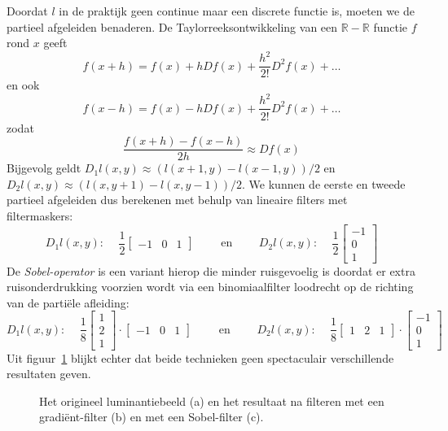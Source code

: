 Doordat $l$ in de praktijk geen continue maar een discrete functie is, moeten we de partieel afgeleiden benaderen.
De Taylorreeksontwikkeling van een $\mathbb{R} - \mathbb{R}$ functie $f$ rond $x$ geeft
$$
f(x+h) = f(x) + h D f(x) + \frac{h^2}{2!} D^2 f(x) + \ldots
$$
en ook
$$
f(x-h) = f(x) - h D f(x) + \frac{h^2}{2!} D^2 f(x) + \ldots
$$
zodat
$$
\frac{f(x+h) - f(x-h)}{2h} \approx D f(x)
$$
Bijgevolg geldt $D_1 l(x,y) \approx (l(x+1,y) - l(x-1,y))/2$ en $D_2 l(x,y) \approx (l(x,y+1) - l(x,y-1))/2$. We
kunnen de eerste en tweede partieel afgeleiden dus berekenen met behulp van lineaire filters met filtermaskers:
$$
D_1 l(x,y)\textrm{: }\quad \frac{1}{2} \left[ \begin{array}{ccc} -1 & 0 & 1 \end{array} \right] \qquad \textrm{ en } 
\qquad D_2 l(x,y)\textrm{: }\quad \frac{1}{2} \left[ \begin{array}{c} -1 \\ 0 \\ 1 \end{array} \right]
$$
De \emph{Sobel-operator} is een variant hierop die minder ruisgevoelig is doordat er 
extra ruisonderdrukking voorzien wordt via een binomiaalfilter loodrecht op de richting 
van de parti\"ele afleiding:
$$
D_1 l(x,y)\textrm{: }\quad \frac{1}{8} \left[ \begin{array}{c} 1 \\ 2 \\ 1 \end{array} \right] \cdot \left[ \begin{array}{ccc} -1 & 0 & 1 \end{array} \right] \qquad \textrm{ en } 
\qquad D_2 l(x,y)\textrm{: }\quad \frac{1}{8} \left[ \begin{array}{ccc} 1 & 2 & 1 \end{array} \right] \cdot \left[ \begin{array}{c} -1 \\ 0 \\ 1 \end{array} \right]
$$
Uit figuur~\ref{fig:randdetectie} blijkt echter dat beide technieken geen spectaculair verschillende 
resultaten geven.

\begin{figure}[tb]
\begin{center}
\caption{\label{fig:randdetectie}Het origineel luminantiebeeld (a) en het resultaat na filteren met een gradi\"ent-filter (b) en met een Sobel-filter (c).}
\end{center}
\end{figure}